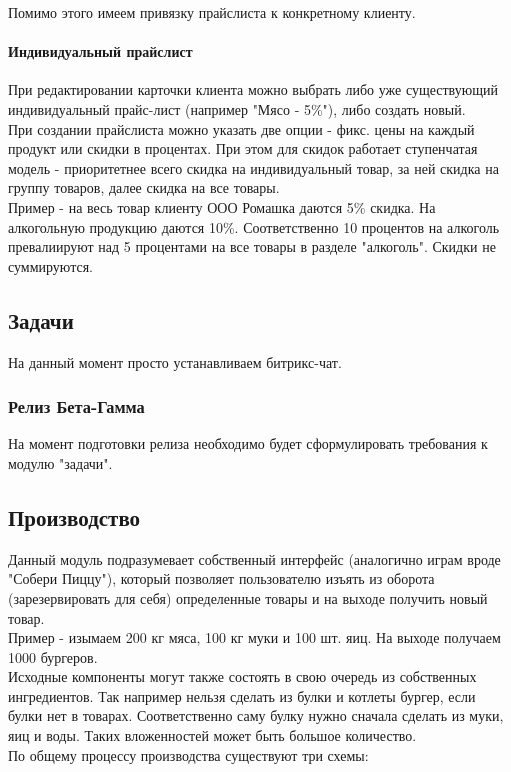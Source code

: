 \documentclass[DIV=calc, paper=a4, fontsize=11pt]{scrartcl} %
\begin{document}
Помимо этого имеем привязку прайслиста к конкретному клиенту.

\paragraph{Индивидуальный прайслист}

При редактировании карточки клиента можно выбрать либо уже существующий индивидуальный прайс-лист (например "Мясо - 5\%"), либо создать новый.
\\[0.5cm]
При создании прайслиста можно указать две опции - фикс. цены на каждый продукт или скидки в процентах. При этом для скидок работает ступенчатая модель - приоритетнее всего скидка на индивидуальный товар, за ней скидка на группу товаров, далее скидка на все товары.
\\[0.5cm]
Пример - на весь товар клиенту ООО Ромашка даются 5\% скидка. На алкогольную продукцию даются 10\%. Соответственно 10 процентов на алкоголь превалиируют над 5 процентами на все товары в разделе "алкоголь". Скидки не суммируются.

\subsection{Задачи}

На данный момент просто устанавливаем битрикс-чат.

\subsubsection{Релиз Бета-Гамма}
На момент подготовки релиза необходимо будет сформулировать требования к модулю "задачи".

\subsection{Производство}

Данный модуль подразумевает собственный интерфейс (аналогично играм вроде "Собери Пиццу"), который позволяет пользователю изъять из оборота (зарезервировать для себя) определенные товары и на выходе получить новый товар.
\\[0.5cm]
Пример - изымаем 200 кг мяса, 100 кг муки и 100 шт. яиц. На выходе получаем 1000 бургеров. 
\\[0.5cm]
Исходные компоненты могут также состоять в свою очередь из собственных ингредиентов. Так например нельзя сделать из булки и котлеты бургер, если булки нет в товарах. Соответственно саму булку нужно сначала сделать из муки, яиц и воды. Таких вложенностей может быть большое количество.
\\[0.5cm]
По общему процессу производства существуют три схемы:
\end{document}
